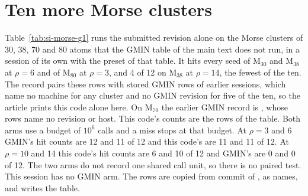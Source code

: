 \documentclass[journal=jctcce,manuscript=suppinfo]{achemso}
\begin{document}
\section{Ten more Morse clusters}
\label{sec:si-morse-g1}
Table~\ref{tab:si-morse-g1} runs the submitted revision alone on the Morse
clusters of 30, 38, 70 and 80 atoms that the GMIN table of the main text does
not run, in a session of its own with the preset of that table.
It hits every seed of M\(_{30}\) and M\(_{38}\) at \(\rho=6\) and of
M\(_{80}\) at \(\rho=3\), and 4 of 12 on M\(_{38}\) at \(\rho=14\), the
fewest of the ten.
The record pairs these rows with stored GMIN rows of earlier sessions, which
name no machine for any cluster and no GMIN revision for five of the ten, so
the article prints this code alone here.
On M\(_{70}\) the earlier GMIN record is ,
whose rows name no revision or host.
This code's counts are the rows of the table.
Both arms use a budget of \(10^{6}\) calls and a miss stops at that budget.
At \(\rho=3\) and 6 GMIN's hit counts are 12 and 11 of 12 and this code's are 11 and 11 of 12.
At \(\rho=10\) and 14 this code's hit counts are 6 and 10 of 12 and GMIN's are 0 and 0 of 12.
The two arms do not record one shared call unit, so there is no paired test.
This session has no GMIN arm.
The rows are copied from commit \texttt{}
of , as 
names, and  writes the table.
\end{document}
